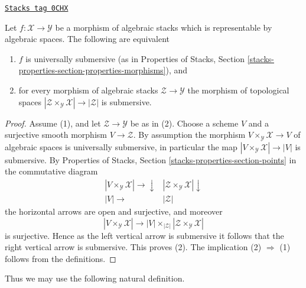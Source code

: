 \begin{lemma}
\label{stacks-morphisms-lemma-characterize-representable-universally-submersive}
\href{https://stacks.math.columbia.edu/tag/0CHX}{\texttt{Stacks tag 0CHX}}

Let $f : \mathcal{X} \to \mathcal{Y}$ be a morphism of
algebraic stacks which is representable by algebraic spaces.
The following are equivalent
\begin{enumerate}
\item $f$ is universally submersive (as in Properties of Stacks,
Section \ref{stacks-properties-section-properties-morphisms}), and
\item for every morphism of algebraic stacks $\mathcal{Z} \to \mathcal{Y}$
the morphism of topological spaces
$|\mathcal{Z} \times_\mathcal{Y} \mathcal{X}| \to |\mathcal{Z}|$ is submersive.
\end{enumerate}
\end{lemma}

\begin{proof}
Assume (1), and let $\mathcal{Z} \to \mathcal{Y}$ be as in (2).
Choose a scheme $V$ and a surjective smooth morphism $V \to \mathcal{Z}$.
By assumption the morphism $V \times_\mathcal{Y} \mathcal{X} \to V$
of algebraic spaces is universally submersive, in particular the map
$|V \times_\mathcal{Y} \mathcal{X}| \to |V|$ is submersive. By
Properties of Stacks, Section \ref{stacks-properties-section-points}
in the commutative diagram
$$
\begin{array}{cc}|V \times_\mathcal{Y} \mathcal{X}| \longrightarrow\downarrow & |\mathcal{Z} \times_\mathcal{Y} \mathcal{X}| \downarrow \\ |V| \longrightarrow & |\mathcal{Z}|\end{array}
$$
the horizontal arrows are open and surjective, and moreover
$$
|V \times_\mathcal{Y} \mathcal{X}| \longrightarrow
|V| \times_{|\mathcal{Z}|} |\mathcal{Z} \times_\mathcal{Y} \mathcal{X}|
$$
is surjective. Hence as the left vertical arrow is submersive it follows that
the right vertical arrow is submersive. This proves (2).
The implication (2) $\Rightarrow$ (1) follows from the definitions.
\end{proof}

Thus we may use the following natural definition.

